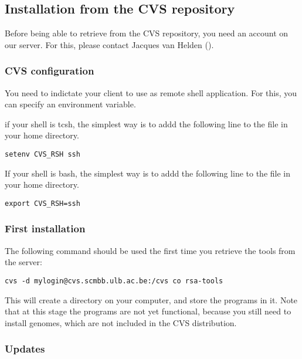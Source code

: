 \documentclass{article}
\begin{document}
\subsection{Installation from the CVS repository}


Before being able to retrieve \RSAT from the CVS repository, you need
an account on our server. For this, please contact Jacques van Helden
().

\subsubsection{CVS configuration}

You need to indictate your  client to use 
as remote shell application. For this, you can specify an environment
variable.

if your shell is tcsh, the simplest way is to addd the following
line to the  file in your home directory.

\begin{verbatim}
setenv CVS_RSH ssh
\end{verbatim}

If your shell is bash, the simplest way is to addd the following line
to the  file in your home directory.

\begin{verbatim}
export CVS_RSH=ssh
\end{verbatim}



\subsubsection{First installation}

The following command should be used the first time you retrieve the
tools from the server:
\begin{verbatim}
cvs -d mylogin@cvs.scmbb.ulb.ac.be:/cvs co rsa-tools
\end{verbatim}

This will create a directory  on your computer, and
store the programs in it. Note that at this stage the programs are not
yet functional, because you still need to install genomes, which are
not included in the CVS distribution.

\subsubsection{Updates}
\end{document}

